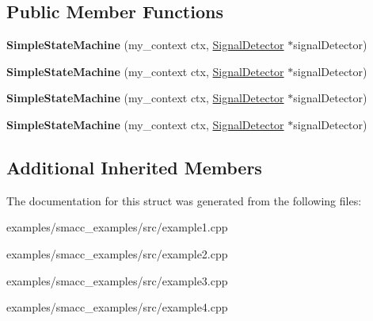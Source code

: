\subsection*{Public Member Functions}
\begin{DoxyCompactItemize}
\item 
{\bfseries Simple\+State\+Machine} (my\+\_\+context ctx, \hyperlink{classsmacc_1_1SignalDetector}{Signal\+Detector} $\ast$signal\+Detector)\hypertarget{structSimpleStateMachine_a66930f5ee365d71b115ef1e88da23a3e}{}\label{structSimpleStateMachine_a66930f5ee365d71b115ef1e88da23a3e}

\item 
{\bfseries Simple\+State\+Machine} (my\+\_\+context ctx, \hyperlink{classsmacc_1_1SignalDetector}{Signal\+Detector} $\ast$signal\+Detector)\hypertarget{structSimpleStateMachine_a66930f5ee365d71b115ef1e88da23a3e}{}\label{structSimpleStateMachine_a66930f5ee365d71b115ef1e88da23a3e}

\item 
{\bfseries Simple\+State\+Machine} (my\+\_\+context ctx, \hyperlink{classsmacc_1_1SignalDetector}{Signal\+Detector} $\ast$signal\+Detector)\hypertarget{structSimpleStateMachine_a66930f5ee365d71b115ef1e88da23a3e}{}\label{structSimpleStateMachine_a66930f5ee365d71b115ef1e88da23a3e}

\item 
{\bfseries Simple\+State\+Machine} (my\+\_\+context ctx, \hyperlink{classsmacc_1_1SignalDetector}{Signal\+Detector} $\ast$signal\+Detector)\hypertarget{structSimpleStateMachine_a66930f5ee365d71b115ef1e88da23a3e}{}\label{structSimpleStateMachine_a66930f5ee365d71b115ef1e88da23a3e}

\end{DoxyCompactItemize}
\subsection*{Additional Inherited Members}


The documentation for this struct was generated from the following files\+:\begin{DoxyCompactItemize}
\item 
examples/smacc\+\_\+examples/src/example1.\+cpp\item 
examples/smacc\+\_\+examples/src/example2.\+cpp\item 
examples/smacc\+\_\+examples/src/example3.\+cpp\item 
examples/smacc\+\_\+examples/src/example4.\+cpp\end{DoxyCompactItemize}
